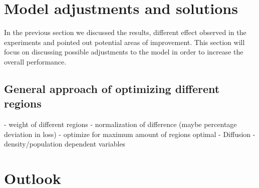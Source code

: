 
\section{Model adjustments and solutions}
In the previous section we discussed the results, different effect observed in the experiments and pointed out potential areas of
improvement. This section will focus on discussing possible adjustments to the model in order to increase the overall performance.


\subsection{General approach of optimizing different regions}
- weight of different regions
	- normalization of difference (maybe percentage deviation in loss)
	- optimize for maximum amount of regions optimal
- Diffusion
- density/population dependent variables

\subsection{}


\section{Outlook}




